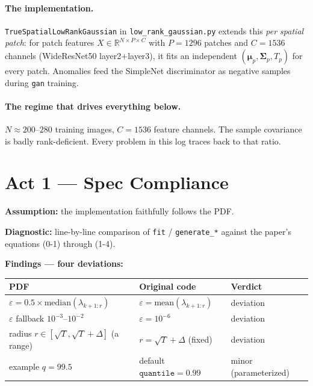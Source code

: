 \documentclass[11pt]{article}
\newcommand{\code}[1]{\texttt{#1}}
\newcommand{\bmu}{\boldsymbol{\mu}}
\newcommand{\bSigma}{\boldsymbol{\Sigma}}
\begin{document}
\paragraph{The implementation.}
\code{TrueSpatialLowRankGaussian} in \code{low\_rank\_gaussian.py} extends this
\emph{per spatial patch}: for patch features $X \in \mathbb{R}^{N \times P \times C}$
with $P = 1296$ patches and $C = 1536$ channels (WideResNet50 layer2+layer3), it
fits an independent $(\bmu_p, \bSigma_p, T_p)$ for every patch. Anomalies feed the
SimpleNet discriminator as negative samples during \code{gan} training.

\paragraph{The regime that drives everything below.}
$N \approx 200$--$280$ training images, $C = 1536$ feature channels. The sample
covariance is badly rank-deficient. Every problem in this log traces back to that
ratio.

\section{Act 1 --- Spec Compliance}

\textbf{Assumption:} the implementation faithfully follows the PDF.

\medskip
\noindent
\textbf{Diagnostic:} line-by-line comparison of \code{fit} / \code{generate\_*}
against the paper's equations (0-1) through (1-4).

\medskip
\noindent
\textbf{Findings --- four deviations:}

\begin{center}
\begin{tabular}{lll}
\toprule
PDF & Original code & Verdict \\
\midrule
$\varepsilon = 0.5 \times \mathrm{median}(\lambda_{k+1:r})$
  & $\varepsilon = \mathrm{mean}(\lambda_{k+1:r})$ & deviation \\
$\varepsilon$ fallback $10^{-3}$--$10^{-2}$
  & $\varepsilon = 10^{-6}$ & deviation \\
radius $r \in [\sqrt{T},\sqrt{T}+\Delta]$ (a range)
  & $r = \sqrt{T} + \Delta$ (fixed) & deviation \\
example $q = 99.5$
  & default $\code{quantile} = 0.99$ & minor (parameterized) \\
\bottomrule
\end{tabular}
\end{center}
\end{document}
